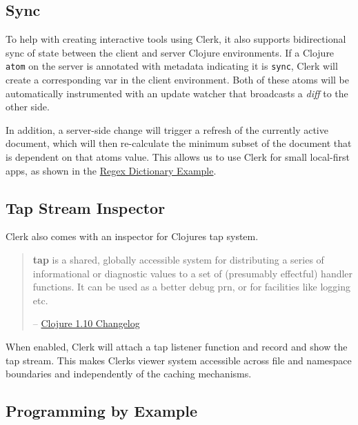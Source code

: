\documentclass[sigconf,screen]{acmart}
\newcommand{\passthrough}[1]{#1}
\begin{document}
\hypertarget{sync}{%
\subsection{Sync}\label{sync}}

To help with creating interactive tools using Clerk, it also supports bidirectional sync of state between the client and server Clojure environments. If a Clojure \passthrough{\lstinline!atom!} on the server is annotated with metadata indicating it is \passthrough{\lstinline!sync!}, Clerk will create a corresponding var in the client environment. Both of these atoms will be automatically instrumented with an update watcher that broadcasts a \emph{diff} to the other side.

In addition, a server-side change will trigger a refresh of the currently active document, which will then re-calculate the minimum subset of the document that is dependent on that atom\textquotesingle s value. This allows us to use Clerk for small local-first apps, as shown in the \protect\hyperlink{regex-dictionary}{Regex Dictionary Example}.

\hypertarget{tap-stream-inspector}{%
\subsection{Tap Stream Inspector}\label{tap-stream-inspector}}

Clerk also comes with an inspector for Clojure\textquotesingle s tap system.

\begin{quote}
\textbf{tap} is a shared, globally accessible system for distributing a series of informational or diagnostic values to a set of (presumably effectful) handler functions. It can be used as a better debug prn, or for facilities like logging etc.

-- \href{https://github.com/clojure/clojure/blob/0b42eab4bfca5270e0d2b2e58d83b1e2c8a85473/changes.md\#23-tap}{Clojure 1.10 Changelog}
\end{quote}

When enabled, Clerk will attach a tap listener function and record and show the tap stream. This makes Clerk\textquotesingle s viewer system accessible across file and namespace boundaries and independently of the caching mechanisms.

\hypertarget{programming-by-example}{%
\subsection{Programming by Example}\label{programming-by-example}}
\end{document}
